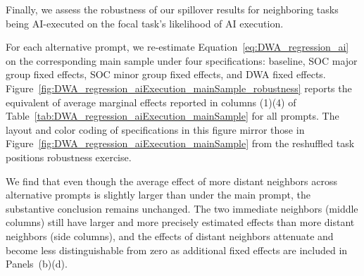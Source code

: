 Finally, we assess the robustness of our spillover results for neighboring tasks being AI-executed on the focal task's likelihood of AI execution.

For each alternative prompt, we re-estimate Equation~\eqref{eq:DWA_regression_ai} on the corresponding main sample under four specifications: baseline, SOC major group fixed effects, SOC minor group fixed effects, and DWA fixed effects.
Figure~\ref{fig:DWA_regression_aiExecution_mainSample_robustness} reports the equivalent of average marginal effects reported in columns (1)\textendash(4) of Table~\ref{tab:DWA_regression_aiExecution_mainSample} for all prompts.
The layout and color coding of specifications in this figure mirror those in Figure~\ref{fig:DWA_regression_aiExecution_mainSample} from the reshuffled task positions robustness exercise.

We find that even though the average effect of more distant neighbors across alternative prompts is slightly larger than under the main prompt, the substantive conclusion remains unchanged.
The two immediate neighbors (middle columns) still have larger and more precisely estimated effects than more distant neighbors (side columns), and the effects of distant neighbors attenuate and become less distinguishable from zero as additional fixed effects are included in Panels~(b)\textendash (d).

